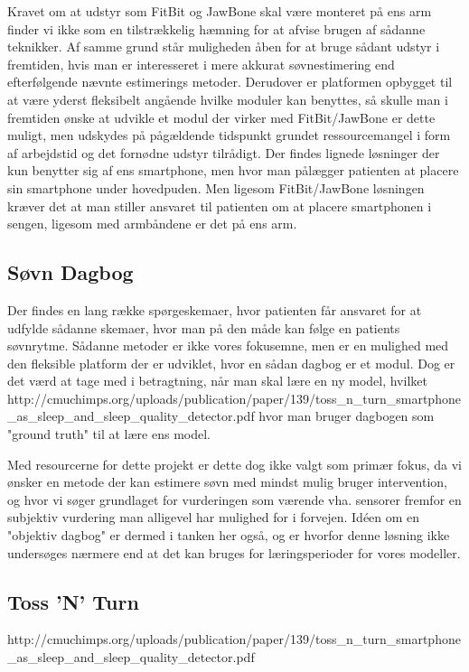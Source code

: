 Kravet om at udstyr som FitBit og JawBone skal være monteret på ens arm finder vi ikke som en tilstrækkelig hæmning for at afvise brugen af sådanne teknikker.
Af samme grund står muligheden åben for at bruge sådant udstyr i fremtiden, hvis man er interesseret i mere akkurat søvnestimering end efterfølgende nævnte estimerings metoder.
Derudover er platformen opbygget til at være yderst fleksibelt angående hvilke moduler kan benyttes, så skulle man i fremtiden ønske at udvikle et modul der virker med FitBit/JawBone er dette muligt, men udskydes på pågældende tidspunkt grundet ressourcemangel i form af arbejdstid og det fornødne udstyr tilrådigt.
Der findes lignede løsninger der kun benytter sig af ens smartphone, men hvor man pålægger patienten at placere sin smartphone under hovedpuden.
Men ligesom FitBit/JawBone løsningen kræver det at man stiller ansvaret til patienten om at placere smartphonen i sengen, ligesom med armbåndene er det på ens arm.

\subsection{Søvn Dagbog}
Der findes en lang række spørgeskemaer, hvor patienten får ansvaret for at udfylde sådanne skemaer, hvor man på den måde kan følge en patients søvnrytme.
Sådanne metoder er ikke vores fokusemne, men er en mulighed med den fleksible platform der er udviklet, hvor en sådan dagbog er et modul.
Dog er det værd at tage med i betragtning, når man skal lære en ny model, hvilket http://cmuchimps.org/uploads/publication/paper/139/toss_n_turn_smartphone_as_sleep_and_sleep_quality_detector.pdf
hvor man bruger dagbogen som "ground truth" til at lære ens model.

Med resourcerne for dette projekt er dette dog ikke valgt som primær fokus, da vi ønsker en metode der kan estimere søvn med mindst mulig bruger intervention, og hvor vi søger grundlaget for vurderingen som værende vha. sensorer fremfor en subjektiv vurdering man alligevel har mulighed for i forvejen.
Idéen om en "objektiv dagbog" er dermed i tanken her også, og er hvorfor denne løsning ikke undersøges nærmere end at det kan bruges for læringsperioder for vores modeller.

\subsection{Toss 'N' Turn}
http://cmuchimps.org/uploads/publication/paper/139/toss_n_turn_smartphone_as_sleep_and_sleep_quality_detector.pdf

